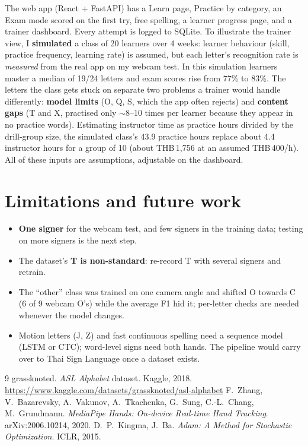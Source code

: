 \documentclass[10pt,a4paper]{article}
\begin{document}
The web app (React + FastAPI) has a Learn page, Practice by category, an Exam mode scored on the
first try, free spelling, a learner progress page, and a trainer dashboard. Every attempt is
logged to SQLite. To illustrate the trainer view, I \textbf{simulated} a class of 20 learners over
4 weeks: learner behaviour (skill, practice frequency, learning rate) is assumed, but each
letter's recognition rate is \emph{measured} from the real app on my webcam test. In this
simulation learners master a median of 19/24 letters and exam scores rise from 77\% to 83\%.
The letters the class gets stuck on separate two problems a trainer would handle differently:
\textbf{model limits} (O, Q, S, which the app often rejects) and \textbf{content gaps} (T and X,
practised only $\sim$8--10 times per learner because they appear in no practice words).
Estimating instructor time as practice hours divided by the drill-group size, the simulated
class's 43.9 practice hours replace about 4.4 instructor hours for a group of 10 (about
THB\,1,756 at an assumed THB\,400/h). All of these inputs are assumptions, adjustable on the
dashboard.

\section{Limitations and future work}

\begin{itemize}
  \item \textbf{One signer} for the webcam test, and few signers in the training data; testing on
        more signers is the next step.
  \item The dataset's \textbf{T is non-standard}: re-record T with several signers and retrain.
  \item The ``other'' class was trained on one camera angle and shifted O towards C (6 of 9 webcam
        O's) while the average F1 hid it; per-letter checks are needed whenever the model changes.
  \item Motion letters (J, Z) and fast continuous spelling need a sequence model (LSTM or CTC);
        word-level signs need both hands. The pipeline would carry over to Thai Sign Language once
        a dataset exists.
\end{itemize}

\begin{thebibliography}{9}
\small
{} grassknoted. \emph{ASL Alphabet} dataset. Kaggle, 2018.
  \url{https://www.kaggle.com/datasets/grassknoted/asl-alphabet}
 F.~Zhang, V.~Bazarevsky, A.~Vakunov, A.~Tkachenka, G.~Sung, C.-L.~Chang,
  M.~Grundmann. \emph{MediaPipe Hands: On-device Real-time Hand Tracking}. arXiv:2006.10214, 2020.
 D.~P.~Kingma, J.~Ba. \emph{Adam: A Method for Stochastic Optimization}. ICLR, 2015.
\end{thebibliography}
\end{document}
